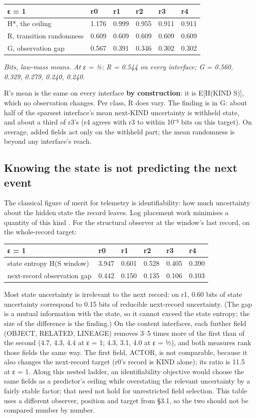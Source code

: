 \documentclass[10pt]{article}
\begin{document}
\begin{longtable}[]{@{}llllll@{}}
\toprule
ε = 1 & r0 & r1 & r2 & r3 & r4\tabularnewline
\midrule
\endhead
H*, the ceiling & 1.176 & 0.999 & 0.955 & 0.911 & 0.911\tabularnewline
R, transition randomness & 0.609 & 0.609 & 0.609 & 0.609 & 0.609\tabularnewline
G, observation gap & 0.567 & 0.391 & 0.346 & 0.302 & 0.302\tabularnewline
\bottomrule
\end{longtable}

\emph{Bits, law-mass means. At ε = ½: R = 0.544 on every interface; G = 0.560, 0.329, 0.279, 0.240, 0.240.}

R's mean is the same on every interface \textbf{by construction}: it is E{[}H(KIND \textbar{} S){]}, which no observation changes. Per
class, R does vary. The finding is in G: about half of the sparsest interface's mean next-KIND uncertainty is withheld
state, and about a third of r3's (r4 agrees with r3 to within 10⁻⁵ bits on this target). On average, added fields act
only on the withheld part; the mean randomness is beyond any interface's reach.

\hypertarget{knowing-the-state-is-not-predicting-the-next-event}{%
\subsection{Knowing the state is not predicting the next event}\label{knowing-the-state-is-not-predicting-the-next-event}}

The classical figure of merit for telemetry is identifiability: how much uncertainty about the hidden state the record
leaves. Log placement work minimises a quantity of this kind \citep{zhao2017log20}. For the structural observer at the
window's last record, on the whole-record target:

\begin{longtable}[]{@{}llllll@{}}
\toprule
ε = 1 & r0 & r1 & r2 & r3 & r4\tabularnewline
\midrule
\endhead
state entropy H(S \textbar{} window) & 3.947 & 0.601 & 0.528 & 0.405 & 0.390\tabularnewline
next-record observation gap & 0.442 & 0.150 & 0.135 & 0.106 & 0.103\tabularnewline
\bottomrule
\end{longtable}

Most state uncertainty is irrelevant to the next record: on r1, 0.60 bits of state uncertainty correspond to 0.15 bits
of reducible next-record uncertainty. (The gap is a mutual information with the state, so it cannot exceed the state
entropy; the size of the difference is the finding.) On the content interfaces, each further field (OBJECT, RELATED,
LINEAGE) removes 3--5 times more of the first than of the second (4.7, 4.3, 4.4 at ε = 1; 4.3, 3.1, 4.0 at ε = ½), and
both measures rank those fields the same way. The first field, ACTOR, is not comparable, because it also changes the
next-record target (r0's record is KIND alone); its ratio is 11.5 at ε = 1. Along this nested ladder, an
identifiability objective would choose the same fields as a predictor's ceiling while overstating the relevant
uncertainty by a fairly stable factor; that need not hold for unrestricted field selection. This table uses a different
observer, position and target from §3.1, so the two should not be compared number by number.
\end{document}
